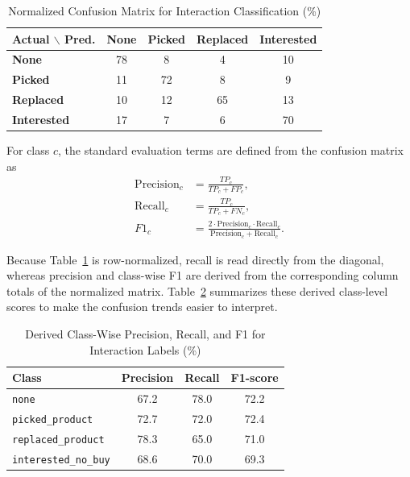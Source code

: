 \documentclass[conference]{IEEEtran}
\begin{document}
\begin{table}[t]
\caption{Normalized Confusion Matrix for Interaction Classification (\%)}
\label{tab:confusion}
\centering
\scriptsize
\begin{tabular}{l c c c c}
\toprule
\textbf{Actual $\backslash$ Pred.} & \textbf{None} & \textbf{Picked} & \textbf{Replaced} & \textbf{Interested} \\
\midrule
\textbf{None} & 78 & 8 & 4 & 10 \\
\textbf{Picked} & 11 & 72 & 8 & 9 \\
\textbf{Replaced} & 10 & 12 & 65 & 13 \\
\textbf{Interested} & 17 & 7 & 6 & 70 \\
\bottomrule
\end{tabular}
\end{table}

For class $c$, the standard evaluation terms are defined from the confusion matrix as
\begin{equation}
\begin{aligned}
\mathrm{Precision}_c &= \frac{TP_c}{TP_c + FP_c}, \\
\mathrm{Recall}_c &= \frac{TP_c}{TP_c + FN_c}, \\
F1_c &= \frac{2 \cdot \mathrm{Precision}_c \cdot \mathrm{Recall}_c}{\mathrm{Precision}_c + \mathrm{Recall}_c}.
\end{aligned}
\end{equation}

Because Table~\ref{tab:confusion} is row-normalized, recall is read directly from the diagonal, whereas precision and class-wise F1 are derived from the corresponding column totals of the normalized matrix. Table~\ref{tab:classmetrics} summarizes these derived class-level scores to make the confusion trends easier to interpret.

\begin{table}[t]
\caption{Derived Class-Wise Precision, Recall, and F1 for Interaction Labels (\%)}
\label{tab:classmetrics}
\centering
\scriptsize
\begin{tabular}{l c c c}
\toprule
\textbf{Class} & \textbf{Precision} & \textbf{Recall} & \textbf{F1-score} \\
\midrule
\texttt{none} & 67.2 & 78.0 & 72.2 \\
\texttt{picked\_product} & 72.7 & 72.0 & 72.4 \\
\texttt{replaced\_product} & 78.3 & 65.0 & 71.0 \\
\texttt{interested\_no\_buy} & 68.6 & 70.0 & 69.3 \\
\bottomrule
\end{tabular}
\end{table}
\end{document}
